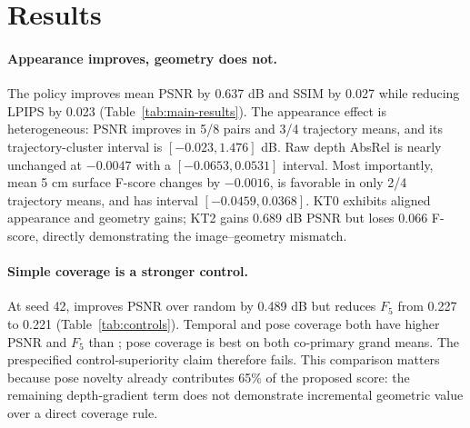 \section{Results}

\begin{table}[t]
  \centering
  \caption{Mean active-minus-random effects within each trajectory, averaged
  over optimization seeds 42 and 43.  Positive is favorable for PSNR, SSIM,
  and $F_5$; negative is favorable for LPIPS and AbsRel.  No trajectory or seed
  is excluded.}
  \label{tab:main-results}
  
\end{table}

\paragraph{Appearance improves, geometry does not.}
The policy improves mean PSNR by 0.637 dB and SSIM by 0.027 while reducing LPIPS
by 0.023 (Table~\ref{tab:main-results}).  The appearance effect is heterogeneous:
PSNR improves in 5/8 pairs and 3/4 trajectory means, and its trajectory-cluster
interval is $[-0.023,1.476]$ dB.  Raw depth AbsRel is nearly unchanged at
$-0.0047$ with a $[-0.0653,0.0531]$ interval.  Most importantly, mean 5 cm
surface F-score changes by $-0.0016$, is favorable in only 2/4 trajectory
means, and has interval $[-0.0459,0.0368]$.  KT0 exhibits aligned appearance
and geometry gains; KT2 gains 0.689 dB PSNR but loses 0.066 F-score, directly
demonstrating the image--geometry mismatch.

\begin{table}[t]
  \centering
  \caption{Seed-42 grand means over four trajectories.  Coverage controls use
  the same seed set, target budget, test frames, optimizer seed, and training
  schedule as \method.  $F_5$ is surface F-score at 5 cm.}
  \label{tab:controls}
  
\end{table}

\paragraph{Simple coverage is a stronger control.}
At seed 42, \method{} improves PSNR over random by 0.489 dB but reduces $F_5$
from 0.227 to 0.221 (Table~\ref{tab:controls}).  Temporal and pose coverage both
have higher PSNR and $F_5$ than \method; pose coverage is best on both
co-primary grand means.  The prespecified control-superiority claim therefore
fails.  This comparison matters because pose novelty already contributes 65\%
of the proposed score: the remaining depth-gradient term does not demonstrate
incremental geometric value over a direct coverage rule.

